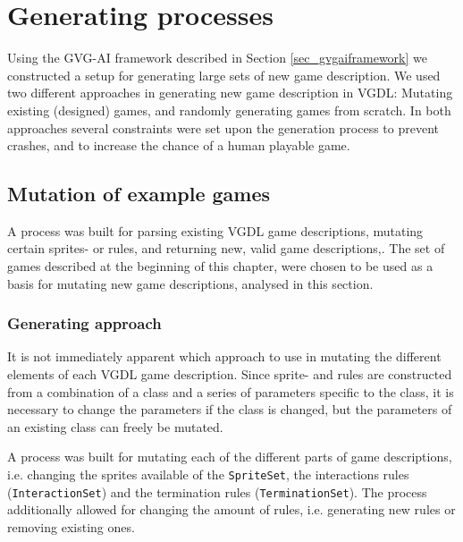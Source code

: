 \documentclass[a4paper,titlepage,final]{report}
\begin{document}



\section{Generating processes}
\label{sec_task1genApproach}
Using the GVG-AI framework described in Section \ref{sec_gvgaiframework} we constructed a setup for generating large sets of new game description.
We used two different approaches in generating new game description in VGDL: Mutating existing (designed) games, and randomly generating games from scratch.
In both approaches several constraints were set upon the generation process to prevent crashes, and to increase the chance of a human playable game.



\subsection{Mutation of example games}
\label{ssec_task1mutation}
A process was built for parsing existing VGDL game descriptions, mutating certain sprites- or rules, and returning new, valid game descriptions,.
The set of games described at the beginning of this chapter, were chosen to be used as a basis for mutating new game descriptions, analysed in this section.



\subsubsection*{Generating approach}
It is not immediately apparent which approach to use in mutating the different elements of  each VGDL game description.
Since sprite- and rules are constructed from a combination of a class and a series of parameters specific to the class, it is necessary to change the parameters if the class is changed, but the parameters of an existing class can freely be mutated.

A process was built for mutating each of the different parts of game descriptions, i.e. changing the sprites available of the \texttt{SpriteSet}, the interactions rules (\texttt{InteractionSet}) and the termination rules (\texttt{TerminationSet}).
The process additionally allowed for changing the amount of rules, i.e. generating new rules or removing existing ones.
\end{document}
